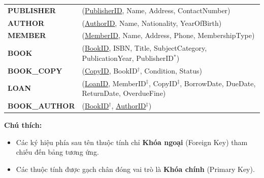 \documentclass[12pt,a4paper]{article}
\begin{document}
\begin{table}[H]
\centering
\renewcommand{\arraystretch}{1.5} %
\begin{tabular}{l p{12cm}}
\textbf{PUBLISHER} & (\underline{PublisherID}, Name, Address, ContactNumber) \\
\textbf{AUTHOR}    & (\underline{AuthorID}, Name, Nationality, YearOfBirth) \\
\textbf{MEMBER}    & (\underline{MemberID}, Name, Address, Phone, MembershipType) \\
\textbf{BOOK}      & (\underline{BookID}, ISBN, Title, SubjectCategory, PublicationYear, PublisherID$^*$) \\
\textbf{BOOK\_COPY} & (\underline{CopyID}, BookID$^\dagger$, Condition, Status) \\
\textbf{LOAN}      & (\underline{LoanID}, MemberID$^\ddagger$, CopyID$^\ddagger$, BorrowDate, DueDate, ReturnDate, OverdueFine) \\
\textbf{BOOK\_AUTHOR} & (\underline{BookID}$^\dagger$, \underline{AuthorID}$^\ddagger$) \\
\end{tabular}
\end{table}

\vspace{0.3cm}
\noindent \textbf{Chú thích:}
\begin{itemize}[leftmargin=1.5cm, labelsep=0.3cm, itemsep=0pt]
    \item[$^*, \dagger, \ddagger$] Các ký hiệu phía sau tên thuộc tính chỉ \textbf{Khóa ngoại} (Foreign Key) tham chiếu đến bảng tương ứng.
    \item[\underline{\hspace{0.3cm}}] Các thuộc tính được gạch chân đóng vai trò là \textbf{Khóa chính} (Primary Key).
\end{itemize}
\end{document}

